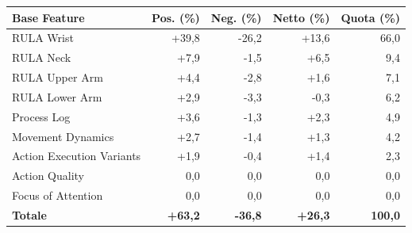 \begin{tabular*}{\linewidth}{@{}l@{\extracolsep{\fill}}rrrr@{}}
\toprule
\textbf{Base Feature} & \textbf{Pos. (\%)} & \textbf{Neg. (\%)} & \textbf{Netto (\%)} & \textbf{Quota (\%)} \\
\midrule
RULA Wrist & +39{,}8 & -26{,}2 & +13{,}6 & 66{,}0 \\
RULA Neck & +7{,}9 & -1{,}5 & +6{,}5 & 9{,}4 \\
RULA Upper Arm & +4{,}4 & -2{,}8 & +1{,}6 & 7{,}1 \\
RULA Lower Arm & +2{,}9 & -3{,}3 & -0{,}3 & 6{,}2 \\
Process Log & +3{,}6 & -1{,}3 & +2{,}3 & 4{,}9 \\
Movement Dynamics & +2{,}7 & -1{,}4 & +1{,}3 & 4{,}2 \\
Action Execution Variants & +1{,}9 & -0{,}4 & +1{,}4 & 2{,}3 \\
Action Quality & 0{,}0 & 0{,}0 & 0{,}0 & 0{,}0 \\
Focus of Attention & 0{,}0 & 0{,}0 & 0{,}0 & 0{,}0 \\
\midrule
\textbf{Totale} & \textbf{+63{,}2} & \textbf{-36{,}8} & \textbf{+26{,}3} & \textbf{100{,}0} \\
\bottomrule
\end{tabular*}
